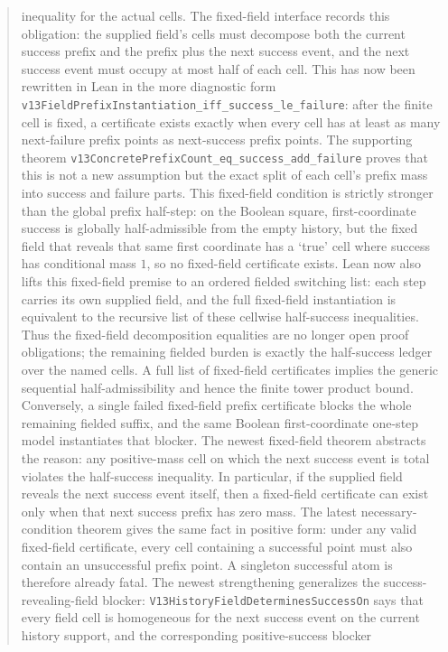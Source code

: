 \documentclass[11pt]{article}
\theoremstyle{remark}
\begin{document}
\begin{abstract}
inequality for the actual cells.  The fixed-field interface records this obligation:
the supplied field's cells must decompose both the current success prefix and the prefix plus the
next success event, and the next success event must occupy at most half of each cell.  This
has now been rewritten in Lean in the more diagnostic form
\texttt{v13FieldPrefixInstantiation\_iff\_success\_le\_failure}: after the finite
cell is fixed, a certificate exists exactly when every cell has at least as many
next-failure prefix points as next-success prefix points.  The supporting theorem
\texttt{v13ConcretePrefixCount\_eq\_success\_add\_failure} proves that this is not
a new assumption but the exact split of each cell's prefix mass into success and
failure parts.  This fixed-field condition is strictly stronger than the global
prefix half-step: on the Boolean square,
first-coordinate success is globally half-admissible from the empty history, but the fixed field
that reveals that same first coordinate has a `true' cell where success has conditional mass \(1\),
so no fixed-field certificate exists.  Lean now also lifts this fixed-field premise to an ordered
fielded switching list: each step carries its own supplied field, and the full fixed-field
instantiation is equivalent to the recursive list of these cellwise half-success inequalities.
Thus the fixed-field decomposition equalities are no longer open proof obligations; the remaining
fielded burden is exactly the half-success ledger over the named cells.  A full list of fixed-field
certificates implies the generic sequential half-admissibility and hence the finite tower product
bound.  Conversely, a single failed fixed-field prefix certificate blocks the whole remaining
fielded suffix, and the same Boolean first-coordinate one-step model instantiates that blocker.
The newest fixed-field theorem abstracts the reason: any positive-mass cell on which the next
success event is total violates the half-success inequality.  In particular, if the supplied field
reveals the next success event itself, then a fixed-field certificate can exist only when that next
success prefix has zero mass.  The latest necessary-condition theorem gives the same fact in
positive form: under any valid fixed-field certificate, every cell containing a successful point
must also contain an unsuccessful prefix point.  A singleton successful atom is therefore already
fatal.  The newest strengthening generalizes the success-revealing-field blocker:
\texttt{V13HistoryFieldDeterminesSuccessOn} says that every field cell is homogeneous for the next
success event on the current history support, and the corresponding positive-success blocker

\end{abstract}
\end{document}
